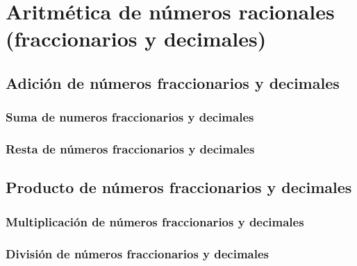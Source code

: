 \thispagestyle{plain}
\section{Aritmética de números racionales (fraccionarios y decimales)}

\subsection{Adición de n\'umeros fraccionarios y decimales}
\subsubsection{Suma de numeros fraccionarios y decimales}
\subsubsection{Resta de n\'umeros fraccionarios y decimales}
\subsection{Producto de n\'umeros fraccionarios y decimales}
\subsubsection{Multiplicación de números fraccionarios y decimales}
\subsubsection{División de números fraccionarios y decimales}
\newpage